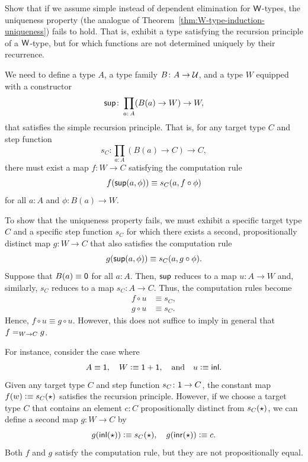 \begin{exr}
    Show that if we assume simple instead of dependent elimination for\/ $\mathsf{W}$-types, the uniqueness property (the analogue of {\upshape Theorem~\ref{thm:W-type-induction-uniqueness}}) fails to hold. That is, exhibit a type satisfying the recursion principle of a\/ $\mathsf{W}$-type, but for which functions are not determined uniquely by their recurrence.
\end{exr}

\begin{solution}
    We need to define a type $A$, a type family $B\colon A\to\univ$, and a type $W$ equipped with a constructor
    \[
        \fun{sup}\colon\prod_{a\colon A}
            (B(a)\to W)\to W,
    \]
    that satisfies the simple recursion principle. That is, for any target type $C$ and step function
    \[
        s_C\colon\prod_{a\colon A}(B(a)\to C)\to C,
    \]
    there must exist a map $f\colon W\to C$ satisfying the computation rule
    \[
        f(\mathsf{sup}(a,\phi))
            \equiv s_C(a,f\circ\phi)
    \]
    for all $a\colon A$ and $\phi\colon B(a)\to W$.

    To show that the uniqueness property fails, we must exhibit a specific target type $C$ and a specific step function $s_C$ for which there exists a second, propositionally distinct map $g\colon W\to C$ that also satisfies the computation rule
    \[
        g(\mathsf{sup}(a,\phi))
            \equiv s_C(a,g\circ\phi).
    \]
    Suppose that $B(a)\equiv\mathsf{0}$ for all $a\colon A$. Then, $\mathsf{sup}$ reduces to a map $u\colon A\to W$ and, similarly, $s_C$ reduces to a map $s_C\colon A\to C$. Thus, the computation rules become
    \begin{align*}
        f\circ u&\equiv s_C,\\
        g\circ u&\equiv s_C.
    \end{align*}
    Hence, $f\circ u\equiv g\circ u$. However, this does not suffice to imply in general that $f\mathrel{=_{W\to C}}g$.
    
    For instance, consider the case where
    \[
        A\equiv\mathsf{1},
        \quad W\mathrel{\vcentcolon}\equiv\mathsf{1}+\mathsf{1},
        \quad\text{and}\quad
        u\mathrel{\vcentcolon}\equiv\mathsf{inl}.
    \]
    Given any target type $C$ and step function $s_C\colon\fun1\to C$, the constant map $f(w)\mathrel{\vcentcolon}\equiv s_C({\mathsf{\star}})$ satisfies the recursion principle. However, if we choose a target type $C$ that contains an element $c\colon C$ propositionally distinct from $s_C({\mathsf{\star}})$, we can define a second map $g\colon W\to C$ by
    \[
        g(\mathsf{inl}({\mathsf{\star}}))\mathrel{\vcentcolon}\equiv s_C({\mathsf{\star}}),
        \quad g(\mathsf{inr}({\mathsf{\star}}))\mathrel{\vcentcolon}\equiv c.
    \]
    Both $f$ and $g$ satisfy the computation rule, but they are not propositionally equal.
    
\end{solution}

